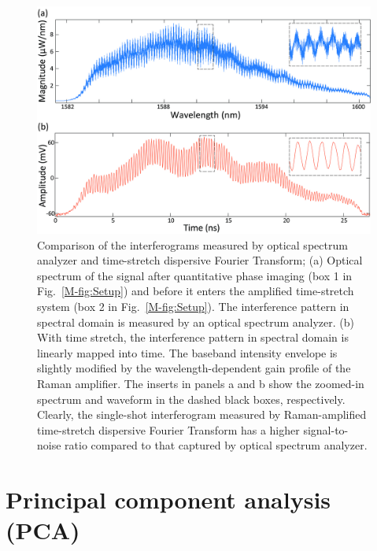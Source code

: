 \documentclass[aps,pra,reprint,longbibliography,groupedaddress]{revtex4-1}
\begin{document}
\begin{figure}
\includegraphics[scale=0.9]{FigureOSA.jpg}
\caption{\label{fig:OSA} Comparison of the interferograms measured by optical spectrum analyzer and time-stretch dispersive Fourier Transform; (a) Optical spectrum of the signal after quantitative phase imaging (box 1 in Fig.~\ref{M-fig:Setup}) and before it enters the amplified time-stretch system (box 2 in Fig.~\ref{M-fig:Setup}). The interference pattern in spectral domain is measured by an optical spectrum analyzer. (b) With time stretch, the interference pattern in spectral domain is linearly mapped into time. The baseband intensity envelope is slightly modified by the wavelength-dependent gain profile of the Raman amplifier. The inserts in panels a and b show the zoomed-in spectrum and waveform in the dashed black boxes, respectively. Clearly, the single-shot interferogram measured by Raman-amplified time-stretch dispersive Fourier Transform has a higher signal-to-noise ratio compared to that captured by optical spectrum analyzer.}
\end{figure}

\section*{Principal component analysis (PCA)}
\end{document}
